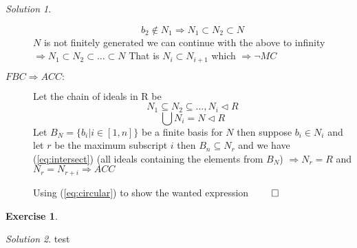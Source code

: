 \documentclass[a4paper,twoside=false,abstract=false,numbers=noenddot,
titlepage=false,headings=small,parskip=half,version=last]{scrartcl}
\theoremstyle{definition}
\newtheorem{exercise}{Exercise}
\theoremstyle{remark}
\newtheorem*{solution}{Solution}
\begin{document}
\begin{solution}
\begin{description}
\begin{equation}
            b_2 \notin N_1 \Rightarrow N_1 \subset N_2 \subset N
        \end{equation}
        $N$ is not finitely generated we can continue with the above to
        infinity $\Rightarrow N_1 \subset N_2 \subset \ldots \subset N$
        That is $N_i \subset N_{i+1}$ which $\Rightarrow \lnot{MC}$
    \item[$FBC\Rightarrow ACC:$]
        Let the chain of ideals in R be
        \begin{equation}
            N_1 \subseteq N_2 \subseteq \dots, N_i \lhd R
        \end{equation}
        \begin{equation}
            \label{eq:intersect}
            \bigcup{N_i}=N\lhd R
        \end{equation}
        Let $B_N=\{b_i|i\in \left[1,n\right]\}$ be a finite basis for $N$ then
        suppose $b_i \in N_i$ and let $r$ be the maximum subscript $i$ then
        $B_n \subseteq N_r$ and we have (\ref{eq:intersect}) (all ideals
        containing the elements from $B_N$) $\Rightarrow N_r=R$ and 
        $N_r=N_{r+i} \Rightarrow ACC$

    Using (\ref{eq:circular}) to show the wanted expression $\qed$


\end{description}

\end{solution}

\begin{exercise}
{\bf
}
\end{exercise}
\begin{solution}
test
\end{solution}

\end{document}
